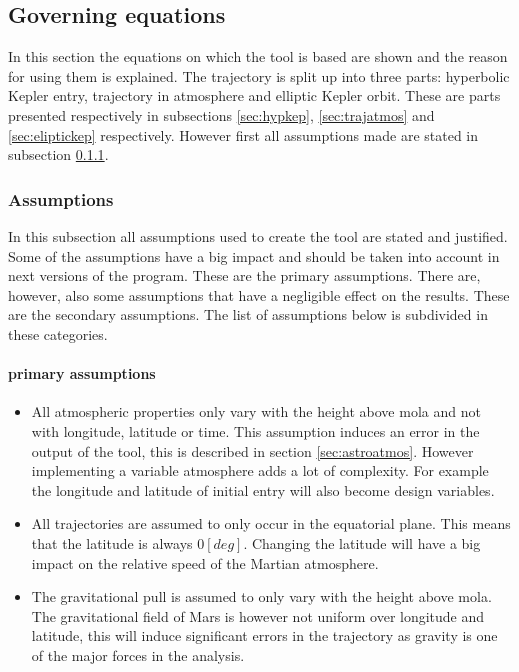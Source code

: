 \subsection{Governing equations}
\label{sec:astrogov}
In this section the equations on which the tool is based are shown and the reason for using them is explained. The trajectory is split up into three parts: hyperbolic Kepler entry, trajectory in atmosphere and elliptic Kepler orbit. These are parts presented respectively in subsections \ref{sec:hypkep}, \ref{sec:trajatmos} and \ref{sec:eliptickep} respectively. However first all assumptions made are stated in subsection \ref{sec:astroassumption}.

\subsubsection{Assumptions}
 \label{sec:astroassumption}
 In this subsection all assumptions used to create the tool are stated and justified. Some of the assumptions have a big impact and should be taken into account in next versions of the program. These are the primary assumptions. There are, however, also some assumptions that have a negligible effect on the results. These are the secondary assumptions. The list of assumptions below is subdivided in these categories.
 
 \paragraph{primary assumptions}
 \begin{itemize}
 \item All atmospheric properties only vary with the height above \gls{mola} and not with longitude, latitude or time. This assumption induces an error in the output of the tool, this is described in section \ref{sec:astroatmos}. However implementing a variable atmosphere adds a lot of complexity. For example the longitude and latitude of initial entry will also become design variables.
 \item All trajectories are assumed to only occur in the equatorial plane. This means that the latitude is always $0 \left[deg\right]$. Changing the latitude will have a big impact on the relative speed of the Martian atmosphere.
 \item The gravitational pull is assumed to only vary with the height above \gls{mola}. The gravitational field of Mars is however not uniform over longitude and latitude, this will induce significant errors in the trajectory as gravity is one of the major forces in the analysis.
 \end{itemize}

